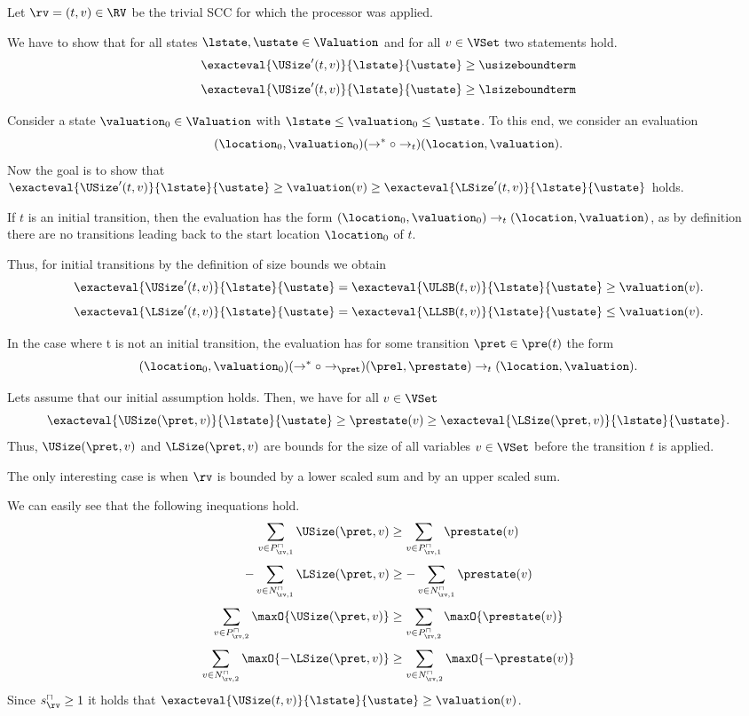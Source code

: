 Let $\rv = (t, v) \in \RV$ be the trivial SCC for which the processor was applied.

We have to show that for all states $\lstate, \ustate \in \Valuation$ and for all $v \in \VSet$ two statements hold.
\[ \exacteval{\USize'(t, v)}{\lstate}{\ustate} \geq \usizeboundterm \]
\[ \exacteval{\USize'(t, v)}{\lstate}{\ustate} \geq \lsizeboundterm \]

Consider a state $\valuation_0 \in \Valuation$ with $\lstate \leq \valuation_0 \leq \ustate$.
To this end, we consider an evaluation
\[ (\location_0, \valuation_0) (\rightarrow^* \circ \rightarrow_t) (\location, \valuation). \]
Now the goal is to show that $\exacteval{\USize'(t, v)}{\lstate}{\ustate} \geq \valuation(v) \geq \exacteval{\LSize'(t, v)}{\lstate}{\ustate}$ holds.

If $t$ is an initial transition, then the evaluation has the form $(\location_0, \valuation_0) \rightarrow_t (\location, \valuation)$, as by definition there are no transitions leading back to the start location $\location_0$ of $t$.

Thus, for initial transitions by the definition of size bounds we obtain
\[ \exacteval{\USize'(t, v)}{\lstate}{\ustate} = \exacteval{\ULSB(t, v)}{\lstate}{\ustate} \geq \valuation(v). \]
\[ \exacteval{\LSize'(t, v)}{\lstate}{\ustate} = \exacteval{\LLSB(t, v)}{\lstate}{\ustate} \leq \valuation(v). \]

In the case where t is not an initial transition, the evaluation has for some transition $\pret \in \pre(t)$ the form
\[ (\location_0, \valuation_0) (\rightarrow^* \circ \rightarrow_\pret) (\prel, \prestate) \rightarrow_t (\location, \valuation). \]

Lets assume that our initial assumption holds.
Then, we have for all $v \in \VSet$
\[ \exacteval{\USize(\pret, v)}{\lstate}{\ustate} \geq \prestate(v) \geq \exacteval{\LSize(\pret, v)}{\lstate}{\ustate}. \]
Thus, $\USize(\pret, v)$ and $\LSize(\pret, v)$ are bounds for the size of all variables $v \in \VSet$ before the transition $t$ is applied.

The only interesting case is when $\rv$ is bounded by a lower scaled sum and by an upper scaled sum.

We can easily see that the following inequations hold.
\[ \sum_{v \in P_{\rv,1}^\sqcap} \USize(\pret, v) \geq \sum_{v \in P_{\rv,1}^\sqcap} \prestate(v) \]
\[ - \sum_{v \in N_{\rv,1}^\sqcap} \LSize(\pret, v) \geq - \sum_{v \in N_{\rv,1}^\sqcap} \prestate(v) \]
\[ \sum_{v \in P_{\rv,2}^\sqcap} \maxO{\USize(\pret, v)} \geq \sum_{v \in P_{\rv,2}^\sqcap} \maxO{\prestate(v)} \]
\[ \sum_{v \in N_{\rv,2}^\sqcap} \maxO{-\LSize(\pret, v)} \geq \sum_{v \in N_{\rv,2}^\sqcap} \maxO{-\prestate(v)} \]
Since $s^\sqcap_\rv \geq 1$ it holds that $\exacteval{\USize(t, v)}{\lstate}{\ustate} \geq \valuation(v)$.

